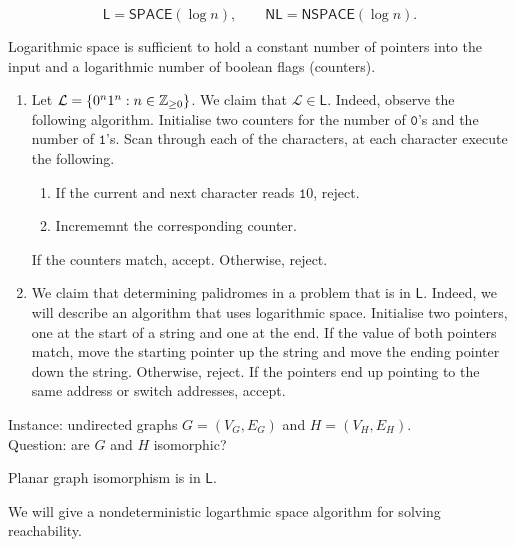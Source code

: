 \begin{definition}
	\[
		\mathsf L = \mathsf{SPACE}(\log n), \qquad
		\mathsf{NL} = \mathsf{NSPACE}(\log n).
	\]
\end{definition}

Logarithmic space is sufficient to hold a constant number of pointers
into the input and a logarithmic number of boolean flags (counters).

\begin{examples}
	\begin{enumerate}
		\item Let $\mathcal L = \left\{
			0^n 1^n : n \in \mathbb{Z}_{\geq 0}
		\right\}$.
		We claim that $\mathcal L \in \mathsf L$.
		Indeed, observe the following algorithm.
		Initialise two counters for the number of $\mathtt 0$'s
		and the number of $\mathtt 1$'s.
		Scan through each of the characters, at each character
		execute the following.
		\begin{enumerate}
			\item If the current and next character reads $\mathtt 10$,
				reject.
			\item Incrememnt the corresponding counter.
		\end{enumerate}
		If the counters match, accept.
		Otherwise, reject.

		\item 
		We claim that determining palidromes in a problem that is in
		$\mathsf L$.
		Indeed, we will describe an algorithm that uses logarithmic
		space.
		Initialise two pointers, one at the start of a string and one at the
		end.
		If the value of both pointers match, move the starting pointer
		up the string and move the ending pointer down the string.
		Otherwise, reject.
		If the pointers end up pointing to the same address or switch addresses,
		accept.
	\end{enumerate}
\end{examples}

\begin{problem}
	Instance: undirected graphs $G = (V_G, E_G)$ and
		$H = (V_H, E_H)$. \\
	Question: are $G$ and $H$ isomorphic?
\end{problem}

\begin{theorem}[]
	Planar graph isomorphism is in $\mathsf L$.
\end{theorem}

We will give a nondeterministic logarthmic space algorithm
for solving reachability.

